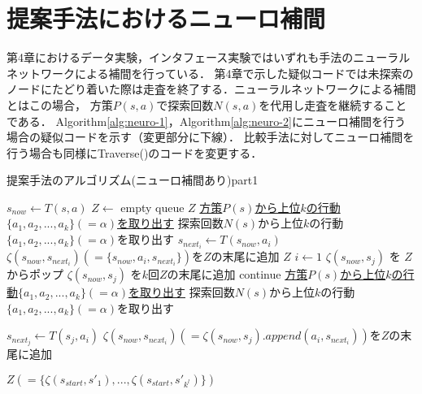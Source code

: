 \section{提案手法におけるニューロ補間}
第4章におけるデータ実験，インタフェース実験ではいずれも手法のニューラルネットワークによる補間を行っている．
第4章で示した疑似コードでは未探索のノードにたどり着いた際は走査を終了する．ニューラルネットワークによる補間とはこの場合，
方策$P(s, a)$で探索回数$N(s, a)$を代用し走査を継続することである．
Algorithm\ref{alg:neuro-1}，Algorithm\ref{alg:neuro-2}にニューロ補間を行う場合の疑似コードを示す（変更部分に下線）．
比較手法に対してニューロ補間を行う場合も同様にTraverse()のコードを変更する．
\begin{algorithm}
    \caption{提案手法のアルゴリズム(ニューロ補間あり)part1}
    \label{alg:neuro-1}
    \small
    \begin{algorithmic}[1]       
           \State $s_{now} \gets T(s, a)$
           \State $Z \gets $ empty queue
             \Return  $Z$
            \EndIf
             \State \underline{方策$P(s)$から上位$k$の行動$\{a_1, a_2, ..., a_{k}\}(=\alpha)$を取り出す}
            \Else
             \State 探索回数$N(s)$から上位$k$の行動$\{a_1, a_2, ..., a_{k}\}(=\alpha)$を取り出す
            \EndIf
             \State $s_{{next}_i} \gets T(s_{now}, a_i)$
             \State $\zeta(s_{now},s_{{next}_i})(=\{s_{now}, a_i, s_{{next}_i}\})$を$Z$の末尾に追加
           \EndFor
             \Return $Z$
           \EndIf
           \State $i \gets 1$
                    \State $\zeta(s_{now}, s_{j})$ を $Z$からポップ
                        \State $\zeta(s_{now}, s_{j})$ を$k$回$Z$の末尾に追加
                        \State continue
                    \EndIf
                       \State \underline{方策$P(s)$から上位$k$の行動$\{a_1, a_2, ..., a_{k}\}(=\alpha)$を取り出す}
                   \Else
                    \State 探索回数$N(s)$から上位$k$の行動$\{a_1, a_2, ..., a_{k}\}(=\alpha)$を取り出す
                   \EndIf
                    
                        \State $s_{{next}_j} \gets T(s_{j}, a_i)$
                        \State $\zeta(s_{now},s_{{next}_i})(=\zeta(s_{now}, s_{j}).append({a_i, s_{{next}_i}}))$を$Z$の末尾に追加
                    \EndFor
                    
                \EndFor     
           \EndWhile
           \Return $Z(=\{\zeta(s_{start}, {s'}_1), ..., \zeta(s_{start}, {s'}_{k^l})\})$
        \EndFunction
    \end{algorithmic}
\end{algorithm}
